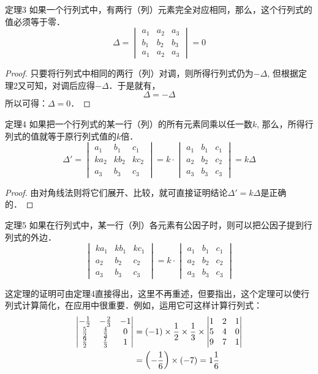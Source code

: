 \begin{blk}{定理3}
 如果一个行列式中，有两行（列）元素完全对应相同，那么，这个行列式的值必须等于零．   
 \[\Delta=\begin{vmatrix}
     a_1&a_2&a_3\\ b_1&b_2&b_3\\a_1&a_2&a_3
 \end{vmatrix}=0\]
\end{blk}

\begin{proof}
只要将行列式中相同的两行（列）对调，则所得行列式仍为$-\Delta$, 但根据定理2又可知，对调后应得$-\Delta$．于是就有，    
\[\Delta=-\Delta\]
所以可得：$\Delta=0$．
\end{proof}

\begin{blk}{定理4}
如果把一个行列式的某一行（列）的所有元素同乘以任一数$k$, 那么，所得行列式的值就等于原行列式值的$k$倍．
\[\Delta'=\begin{vmatrix}
    a_1&b_1&c_1\\ka_2&kb_2&kc_2\\a_3&b_3&c_3
\end{vmatrix}=k\cdot \begin{vmatrix}
    a_1&b_1&c_1\\a_2&b_2&c_2\\a_3&b_3&c_3
\end{vmatrix}=k\Delta\]
\end{blk}

\begin{proof}
由对角线法则将它们展开、比较，就可直接证明结论$\Delta'=k\Delta$是正确的．
\end{proof}

\begin{blk}{定理5}
    如果在行列式中，某一行（列）各元素有公因子时，则可以把公因子提到行列式的外边．
\[\begin{vmatrix}
    ka_1&kb_1&kc_1\\a_2&b_2&c_2\\a_3&b_3&c_3
\end{vmatrix}=k\cdot \begin{vmatrix}
    a_1&b_1&c_1\\a_2&b_2&c_2\\a_3&b_3&c_3
\end{vmatrix}
    \]
\end{blk}

这定理的证明可由定理4直接得出，这里不再重述，但要指出，这个定理可以使行列式计算简化，在应用中很重要．例如，运用它可这样计算行列式：
\[\begin{split}
\begin{vmatrix}
    -\tfrac{1}{2}&-\tfrac{2}{3}&-1\\
    \tfrac{5}{2}&\tfrac{4}{3}&0\\
    \tfrac{9}{2}&\tfrac{7}{3}&1
\end{vmatrix}&=(-1)\times\dfrac{1}{2}\times\dfrac{1}{3}\times\begin{vmatrix}
    1&2&1\\5&4&0\\9&7&1
\end{vmatrix}\\
&=\left(-\dfrac{1}{6}\right)\times(-7)=1\dfrac{1}{6}
\end{split}\]

